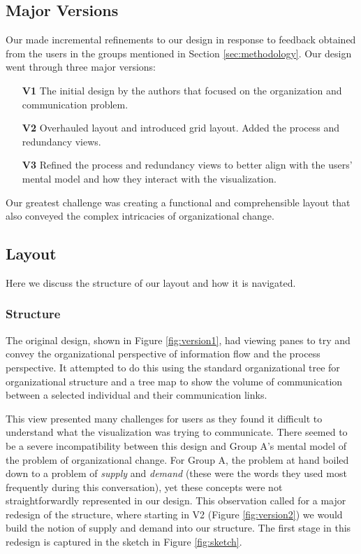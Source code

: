 \documentclass[journal]{vgtc}                %
\begin{document}
\subsection{Major Versions}

Our made incremental refinements to our design in response to feedback obtained from the users in the groups mentioned in Section \ref{sec:methodology}. Our design went through three major versions:

\begin{enumerate}
	\item [\textbf{V1}] The initial design by the authors that focused on the organization and communication problem.
	\item [\textbf{V2}] Overhauled layout and introduced grid layout. Added the process and redundancy views.
	\item [\textbf{V3}] Refined the process and redundancy views to better align with the users' mental model and how they interact with the visualization.
\end{enumerate}

Our greatest challenge was creating a functional and comprehensible layout that also conveyed the complex intricacies of organizational change.

\subsection{Layout}
Here we discuss the structure of our layout and how it is navigated. 
\subsubsection{Structure}
The original design, shown in Figure \ref{fig:version1}, had  viewing panes to try and convey the organizational perspective of information flow and the process perspective.  It attempted to do this using the standard organizational tree for organizational structure and a tree map to show the volume of communication between a selected individual and their communication links.

This view presented many challenges for users as they found it difficult to understand what the visualization was trying to communicate. There seemed to be a severe incompatibility between this design and Group A's mental model of the problem of organizational change. For Group A, the problem at hand boiled down to a problem of \emph{supply} and \emph{demand} (these were the words they used most frequently during this conversation), yet these concepts were not straightforwardly represented in our design. This observation called for a major redesign of the structure, where starting in V2 (Figure \ref{fig:version2}) we would build the notion of supply and demand into our structure. The first stage in this redesign is captured in the sketch in Figure \ref{fig:sketch}.
\end{document}
